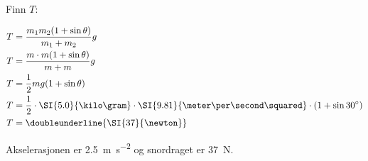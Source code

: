\documentclass[answers,a4paper,12pt]{exam}
\begin{document}
\begin{questions}
\begin{parts}
Finn $T$:

\begin{solution}
\begin{align}
T &= \frac{m_{1} m_{2}(1 + \sin \theta)}{m_{1} + m_{2}} g \\
T &= \frac{m \cdot m(1 + \sin \theta)}{m + m} g \\
T &= \frac{1}{2} mg(1 + \sin \theta) \\
T &= \frac{1}{2} \cdot \SI{5.0}{\kilo\gram} \cdot \SI{9.81}{\meter\per\second\squared} \cdot (1 + \sin 30^{\circ}) \\
T &= \doubleunderline{\SI{37}{\newton}}
\end{align}
\end{solution}

Akselerasjonen er \SI{2.5}{\meter\per\second\squared} og snordraget er \SI{37}{\newton}.
\end{parts}

\end{questions}
\end{document}

